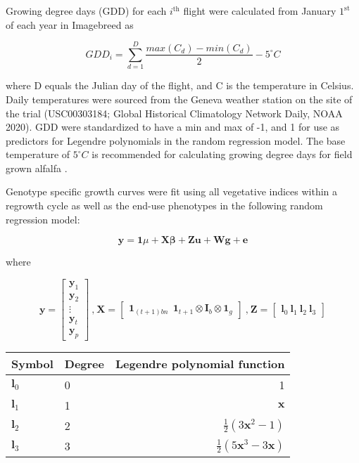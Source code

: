 \documentclass[12pt, letterpaper]{article}
\begin{document}
Growing degree days (GDD) for each $i^\text{th}$ flight were calculated from January $1^\text{st}$ of each year in Imagebreed as 

\begin{equation} \label{gdd}
GDD_i = \sum^D_{d = 1} \frac{max(C_d) - min(C_d)}{2} - 5^\circ C
\end{equation}

\noindent where D equals the Julian day of the flight, and C is the temperature in Celsius. Daily temperatures were sourced from the Geneva weather station on the site of the trial (USC00303184; Global Historical Climatology Network Daily, NOAA 2020). GDD were standardized to have a min and max of -1, and 1 for use as predictors for Legendre polynomials in the random regression model. The base temperature of $5^\circ C$ is recommended for calculating growing degree days for field grown alfalfa \parencite{sharratt1989}.

Genotype specific growth curves were fit using all vegetative indices within a regrowth cycle as well as the end-use phenotypes in the following random regression model:


\begin{equation} \label{rr}
	 \mathbf{y} = \mathbf{1} \mu + \mathbf{X} \boldsymbol{\beta} + \mathbf{Z}\mathbf{u} + \mathbf{W}\mathbf{g} + \mathbf{e} 
\end{equation}

where 

\begin{equation}
 \mathbf{y} = \begin{bmatrix}
    \mathbf{y}_1 \\
    \mathbf{y}_2 \\
    \vdots \\
    \mathbf{y}_t \\
    \mathbf{y}_p
  \end{bmatrix} \ \text{,} \  \mathbf{X} = \begin{bmatrix}
    \mathbf{1}_{(t+1)bn} \ \ \mathbf{1}_{t+1} \otimes \mathbf{I}_{b} \otimes \mathbf{1}_{g}
  \end{bmatrix} \ \text{,} \  \mathbf{Z} = \begin{bmatrix}
    \mathbf{l}_0 \ \mathbf{l}_1 \ \mathbf{l}_2 \ \mathbf{l}_3
  \end{bmatrix}
\end{equation}


\begin{table} 
\begin{tabular}{llr}
	 Symbol & Degree & Legendre polynomial function \\ 
	 \hline
	 $\mathbf{l}_0$ & 0 & 1 \\
	 $\mathbf{l}_1$ & 1 & $\mathbf{x}$ \\
	 $\mathbf{l}_2$ & 2 & $\frac{1}{2}(3\mathbf{x}^2 - 1)$ \\
	 $\mathbf{l}_3$ & 3 & $\frac{1}{2}(5\mathbf{x}^3 - 3\mathbf{x})$ \\
	 \hline
\end{tabular}
\label{legfunc}
\end{table}
\end{document}
